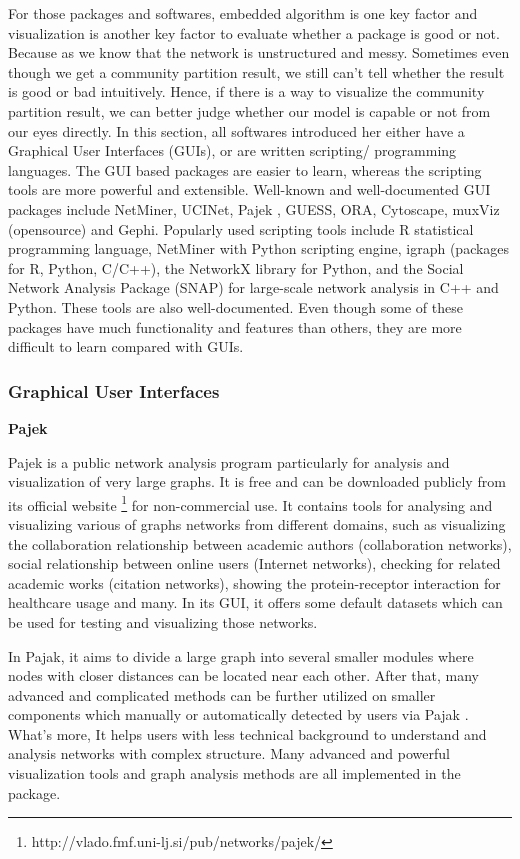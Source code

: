 For those packages and softwares, embedded algorithm is one key factor and visualization is another key factor to evaluate whether a package is good or not. Because as we know that the network is unstructured and messy. Sometimes even though we get a community partition result, we still can't tell whether the result is good or bad intuitively. Hence, if there is a way to visualize the community partition result, we can better judge whether our model is capable or not from our eyes directly. In this section, all softwares introduced her  either have a Graphical User Interfaces (GUIs), or are written scripting/ programming languages. The GUI based packages are easier to learn, whereas the scripting tools are more powerful and extensible. Well-known and well-documented GUI packages include NetMiner, UCINet, Pajek , GUESS, ORA, Cytoscape, muxViz (opensource) and Gephi. Popularly used scripting tools include R statistical programming language, NetMiner with Python scripting engine, igraph (packages for R, Python, C/C++), the NetworkX library for Python, and the Social Network Analysis Package (SNAP) for large-scale network analysis in C++ and Python. These tools are also well-documented. Even though some of these packages have much functionality and features than others, they are more difficult to learn compared with GUIs.

\subsubsection{Graphical User Interfaces}
\textbf{Pajek}

Pajek \cite{de2018exploratory} is a public network analysis  program particularly  for analysis and visualization
of very large graphs. It is free and can be downloaded publicly from its official website \footnote{http://vlado.fmf.uni-lj.si/pub/networks/pajek/} for non-commercial use. It contains tools for analysing and visualizing various of graphs networks from different domains, such as visualizing the collaboration relationship between academic authors (collaboration networks), social relationship between online users (Internet
networks), checking for related academic works (citation networks),  showing the protein-receptor interaction for healthcare usage and many. In its GUI, it offers some default datasets which can be used for testing and visualizing those networks. 

In Pajak, it aims to divide a large graph into  several smaller modules where nodes with closer distances can be located near each other. After that, many advanced and complicated methods can be further utilized on smaller components which manually or automatically detected by users via Pajak . What's more,  It helps users with less technical background to understand and analysis networks with complex structure. Many advanced and powerful visualization tools and graph analysis methods are all implemented in the package. 


